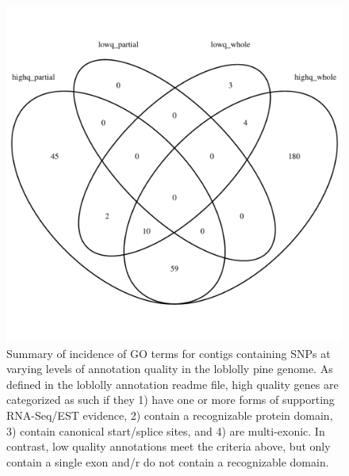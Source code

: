 \documentclass[smallextended]{svjour3}
\begin{document}
\begin{figure}[ht]
\centering
\includegraphics[width=1.0\textwidth]{snp_venn}
\caption{Summary of incidence of GO terms for contigs containing SNPs at varying
  levels of annotation quality in the loblolly pine genome. As defined in the
  loblolly annotation readme file, high quality genes are categorized as such if
  they 1) have one or more forms of supporting RNA-Seq/EST evidence, 2) contain
  a recognizable protein domain, 3) contain canonical start/splice sites, and 4)
  are multi-exonic. In contrast, low quality annotations meet the criteria
  above, but only contain a single exon and/r do not contain a recognizable
  domain.}
\label{f:snp_venn}
\end{figure}

\clearpage
\end{document}
